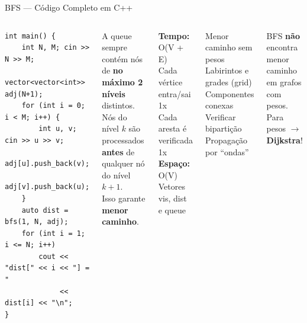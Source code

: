 \documentclass[aspectratio=169,10pt]{beamer}
\begin{document}
\begin{frame}[fragile,shrink=3]{BFS --- Código Completo em C++}
\begin{columns}[t]
\begin{tcolorbox}[caixaCodigo]
\begin{lstlisting}[style=cppsmall]
int main() {
    int N, M; cin >> N >> M;
    vector<vector<int>> adj(N+1);
    for (int i = 0; i < M; i++) {
        int u, v; cin >> u >> v;
        adj[u].push_back(v);
        adj[v].push_back(u);
    }
    auto dist = bfs(1, N, adj);
    for (int i = 1; i <= N; i++)
        cout << "dist[" << i << "] = "
             << dist[i] << "\n";
}
        \end{lstlisting}
      \end{tcolorbox}
      \begin{tcolorbox}[caixaAzul,title={Invariante da BFS}]
        \footnotesize
        A queue sempre contém nós\\
        de \textbf{no máximo 2 níveis} distintos.\\[4pt]
        Nós do nível $k$ são processados\\
        \textbf{antes} de qualquer nó do nível $k+1$.\\[4pt]
        Isso garante \textbf{menor caminho}.
      \end{tcolorbox}
      \vspace{0.08cm}
      \begin{tcolorbox}[caixaVerde,title={Complexidade}]
        \footnotesize
        \textbf{Tempo:} O(V + E)\\
        Cada vértice entra/sai 1x\\
        Cada aresta é verificada 1x\\[3pt]
        \textbf{Espaço:} O(V)\\
        Vetores vis, dist e queue
      \end{tcolorbox}
      \vspace{0.08cm}
      \begin{tcolorbox}[caixaAmarelo,title={Aplicações}]
        \footnotesize
        Menor caminho sem pesos\\
        Labirintos e grades (grid)\\
        Componentes conexas\\
        Verificar bipartição\\
        Propagação por ``ondas''
      \end{tcolorbox}
      \vspace{0.08cm}
      \begin{tcolorbox}[caixaVermelho,title={Atenção}]
        \footnotesize
        BFS \textbf{não} encontra menor\\
        caminho em grafos com pesos.\\
        Para pesos $\to$ \textbf{Dijkstra}!
      \end{tcolorbox}
  \end{columns}
\end{frame}
\end{document}
